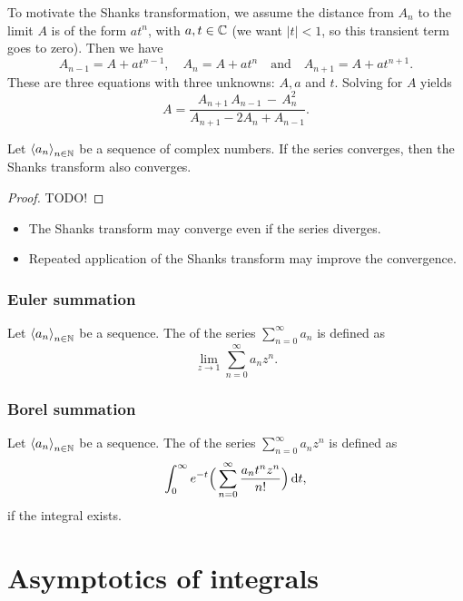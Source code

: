 To motivate the Shanks transformation, we assume the distance from $A_n$ to the limit $A$ is of the form $at^n$, with $a,t\in \mathbb{C}$ (we want $|t| < 1$, so this transient term goes to zero). Then we have
\[ A_{n-1} = A + at^{n-1}, \quad A_{n} = A + at^{n} \quad\text{and}\quad A_{n+1} = A + at^{n+1}. \]
These are three equations with three unknowns: $A,a$ and $t$. Solving for $A$ yields
\[ A = {\frac {A_{n+1}\,A_{n-1}\,-\,A_{n}^{2}}{A_{n+1}-2A_{n}+A_{n-1}}}. \]

\begin{lemma}
Let $\left\langle a_n \right\rangle_{n\in \mathbb{N}}$ be a sequence of complex numbers. If the series converges, then the Shanks transform also converges.
\end{lemma}
\begin{proof}
TODO!
\end{proof}

\begin{example}
\begin{itemize}
\item The Shanks transform may converge even if the series diverges.
\item Repeated application of the Shanks transform may improve the convergence.
\end{itemize}
\end{example}

\subsubsection{Euler summation}
\begin{definition}
Let $\left\langle a_n \right\rangle_{n\in \mathbb{N}}$ be a sequence. The  of the series $\sum_{n=0}^\infty a_n$ is defined as
\[ \lim_{z\to 1}\sum_{n=0}^{\infty}a_nz^n. \]
\end{definition}

\subsubsection{Borel summation}
\begin{definition}
Let $\left\langle a_n \right\rangle_{n\in \mathbb{N}}$ be a sequence. The  of the series $\sum_{n=0}^\infty a_nz^n$ is defined as
\[ \int_0^\infty e^{-t}\Big(\sum_{n=0}^\infty \frac{a_nt^nz^n}{n!}\Big)\operatorname{d \!}{t}, \]
if the integral exists.
\end{definition}

\section{Asymptotics of integrals}


